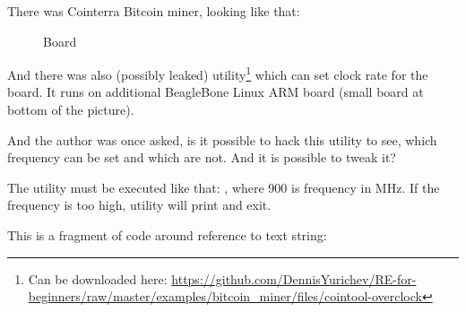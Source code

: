 
There was Cointerra Bitcoin miner, looking like that:

\begin{figure}[H]
\centering
{}
\caption{Board}
\end{figure}

And there was also (possibly leaked) utility\footnote{Can be downloaded here: \url{https://github.com/DennisYurichev/RE-for-beginners/raw/master/examples/bitcoin_miner/files/cointool-overclock}}
which can set clock rate for the board.
It runs on additional BeagleBone Linux ARM board (small board at bottom of the picture).

And the author was once asked, is it possible to hack this utility to see, which frequency can be set and which are not.
And it is possible to tweak it?

The utility must be executed like that: , where 900 is frequency in MHz.
If the frequency is too high, utility will print  and exit.

This is a fragment of code around reference to  text string:

